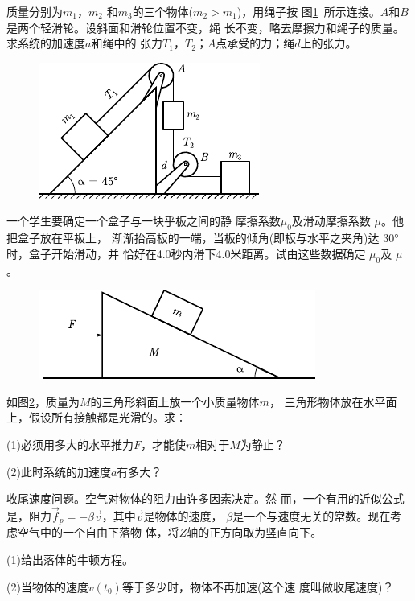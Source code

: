 \begin{exercises}
\exercise 质量分别为$ m_1 $，$  m _ { 2 } $ 和$ m_3 $的三个物体($ m _ { 2 } > m _ { 1 } $)，用绳子按
图\ref{fig:03.28}~所示连接。$ A $和$  B  $是两个轻滑轮。设斜面和滑轮位置不变，绳
长不变，略去摩擦力和绳子的质量。求系统的加速度$ a $和绳中的
张力$  T _ { 1 }  $，$  T _ { 2 }  $；$ A  $点承受的力；绳$ d $上的张力。

\begin{figure}
	\centering
	\includegraphics{figure/fig03.28}
	\caption{}
	\label{fig:03.28}
\end{figure}
\exercise 一个学生要确定一个盒子与一块乎板之间的静
摩擦系数$ \mu _ 0 $及滑动摩擦系数 $\mu$。他把盒子放在平板上，
渐渐抬高板的一端，当板的倾角(即板与水平之夹角)达
\ang{30}时，盒子开始滑动，并
恰好在4.0秒内滑下4.0米距离。试由这些数据确定 $\mu_0$及 $\mu$。

\begin{figure}
	\centering
	\includegraphics{figure/fig03.29}
	\caption{}
	\label{fig:03.29}
\end{figure}
\exercise 如图\ref{fig:03.29}，质量为$ M $的三角形斜面上放一个小质量物体$ m $，
三角形物体放在水平面上，假设所有接触都是光滑的。求：

(1)必须用多大的水平推力$ F $，才能使$ m $相对于$ M $为静止？

(2)此时系统的加速度$ a $有多大？

\exercise 收尾速度问题。空气对物体的阻力由许多因素决定。然
而，一个有用的近似公式是，阻力$  \vec{f} _ { p } = - \beta \vec{v}  $，其中$\vec{v}$是物体的速度，
$\beta$是一个与速度无关的常数。现在考虑空气中的一个自由下落物
体，将$ Z $轴的正方向取为竖直向下。

(1)给出落体的牛顿方程。

(2)当物体的速度$  v( t _ 0)  $等于多少时，物体不再加速(这个速
度叫做收尾速度)？


\end{exercises}
